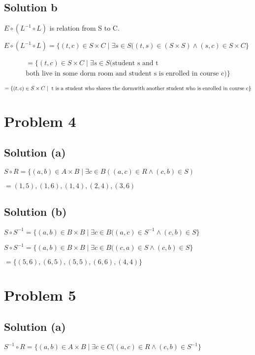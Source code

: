 \documentclass{article}
\begin{document}
\subsection{Solution b}
\noindent

$E \circ (L^{-1} \circ L)$ is relation from S to C.

$E \circ (L^{-1} \circ L) = \{(t,c) \in S \times C \mid \exists s \in
S((t,s) \in (S \times S) \land (s,c) \in S \times C\}$

\begin{multline}
  =\{(t,c) \in S \times C \mid \exists s \in S( \text{student s and t} \\
  \text{both live in some dorm room and student s is enrolled in course c)}\}
\end{multline}

$=\{(t,c) \in S \times C \mid \text{ t is a student who shares the
    dorm \\ with another student who is enrolled in course c}\}$

\section{Problem 4}

\subsection{Solution (a)}
\noindent

$S \circ R = \{(a,b) \in A \times B \mid \exists c \in B((a,c) \in R
\land (c,b) \in S)$

$ = {(1,5), (1,6), (1,4), (2,4), (3,6)}$

\subsection{Solution (b)}
\noindent

$S \circ S^{- 1} = \{(a,b) \in B \times B \mid \exists c \in B((a,c)
\in S^{-1} \land (c,b) \in S\}$

$S \circ S^{- 1} = \{(a,b) \in B \times B \mid \exists c \in B((c,a)
\in S \land (c,b) \in S\}$

$ = \{(5,6),(6,5),(5,5),(6,6),(4,4)\}$

\section{Problem 5}

\subsection{Solution (a)}
\noindent
$S^{-1} \circ R = \{(a,b) \in A \times B \mid \exists c \in C((a,c)
\in R \land (c,b) \in S^{-1}\}$
\end{document}
